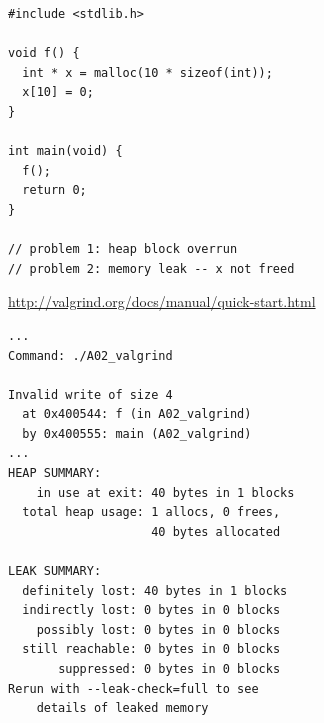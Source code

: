\begin{frame}[fragile]
%
%
\begin{codebox}
\begin{verbatim}
#include <stdlib.h>

void f() {
  int * x = malloc(10 * sizeof(int));
  x[10] = 0;
}                    

int main(void) {
  f();
  return 0;
}

// problem 1: heap block overrun
// problem 2: memory leak -- x not freed
\end{verbatim}
\tiny \url{http://valgrind.org/docs/manual/quick-start.html}
\end{codebox}
%
\begin{cmdbox}
\begin{verbatim}
...
Command: ./A02_valgrind

Invalid write of size 4
  at 0x400544: f (in A02_valgrind)
  by 0x400555: main (A02_valgrind)
...
HEAP SUMMARY:
    in use at exit: 40 bytes in 1 blocks
  total heap usage: 1 allocs, 0 frees, 
                    40 bytes allocated

LEAK SUMMARY:
  definitely lost: 40 bytes in 1 blocks
  indirectly lost: 0 bytes in 0 blocks
    possibly lost: 0 bytes in 0 blocks
  still reachable: 0 bytes in 0 blocks
       suppressed: 0 bytes in 0 blocks
Rerun with --leak-check=full to see 
    details of leaked memory
\end{verbatim}
\end{cmdbox}
%
\end{frame}


